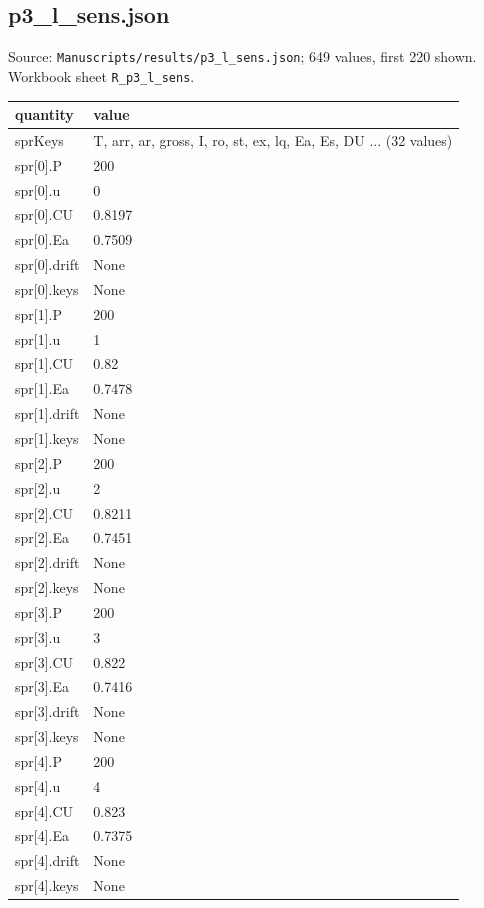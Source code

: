 \subsection*{p3\_l\_sens.json}
\noindent\small Source: \nolinkurl{Manuscripts/results/p3_l_sens.json}; 649 values, first 220 shown. Workbook sheet \texttt{R\_p3\_l\_sens}.\par
{\scriptsize\begin{longtable}{p{}p{}}\toprule\textbf{quantity} & \textbf{value}\\\midrule\endhead
{}sprKeys & T, arr, ar, gross, I, ro, st, ex, lq, Ea, Es, DU ... (32 values)\\
{}spr[0].P & 200\\
{}spr[0].u & 0\\
{}spr[0].CU & 0.8197\\
{}spr[0].Ea & 0.7509\\
{}spr[0].drift & None\\
{}spr[0].keys & None\\
{}spr[1].P & 200\\
{}spr[1].u & 1\\
{}spr[1].CU & 0.82\\
{}spr[1].Ea & 0.7478\\
{}spr[1].drift & None\\
{}spr[1].keys & None\\
{}spr[2].P & 200\\
{}spr[2].u & 2\\
{}spr[2].CU & 0.8211\\
{}spr[2].Ea & 0.7451\\
{}spr[2].drift & None\\
{}spr[2].keys & None\\
{}spr[3].P & 200\\
{}spr[3].u & 3\\
{}spr[3].CU & 0.822\\
{}spr[3].Ea & 0.7416\\
{}spr[3].drift & None\\
{}spr[3].keys & None\\
{}spr[4].P & 200\\
{}spr[4].u & 4\\
{}spr[4].CU & 0.823\\
{}spr[4].Ea & 0.7375\\
{}spr[4].drift & None\\
{}spr[4].keys & None\\

\end{longtable}}
